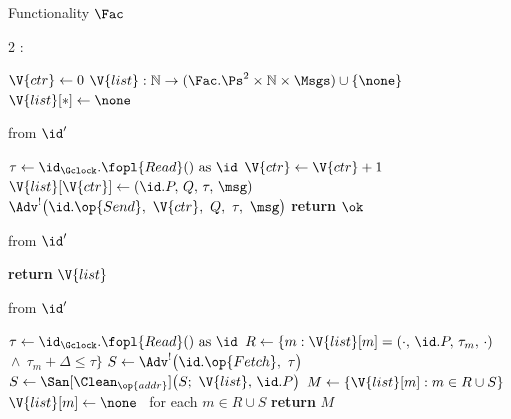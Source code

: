 \begin{interface}[nofloat]{Functionality $\Fac$ \\
\params{$\PID$, \quad $\Ps$, \quad $\admits$, \quad
$\uses := \{(\Gclock,\serves),\,(\Adv,\serves)\}$, \quad $\pars := \Delta$}}

{\scriptsize
\setlength{\columnsep}{1.4em}
\begin{multicols}{2}
:
\begin{algorithmic}[1]
\setcounter{contline}{0}\algcont
\State $\V{ctr} \gets 0$
\State $\V{list} : \mathbb{N} \to (\Fac.\Ps^{2} \times \mathbb{N} \times \Msgs) \cup \{\none\}$
\State $\V{list}[*] \gets \none$
\algsave
\end{algorithmic}
\vspace{1.4ex}

 \quad from $\id'$
\begin{algorithmic}[1]
\algcont
\State $\tau \gets \id_{\Gclock}.\fopl{Read}() \text{ as } \id$ \label{ln:acsendread}
\State $\V{ctr} \gets \V{ctr} + 1$
\State $\V{list}[\V{ctr}] \gets (\id.P,\, Q,\, \tau,\, \msg)$
\State $\Adv^{!}\bigl(\id.\op{Send},\ \V{ctr},\ Q,\ \tau,\ \msg\bigr)$ \label{ln:acsend}
\State \textbf{return} $\ok$
\algsave
\end{algorithmic}
\vspace{1.4ex}

 \quad from $\id'$
\begin{algorithmic}[1]
\algcont
\State \textbf{return} $\V{list}$
\algsave
\end{algorithmic}

\columnbreak

 \quad from $\id'$
\begin{algorithmic}[1]
\algcont
\State $\tau \gets \id_{\Gclock}.\fopl{Read}() \text{ as } \id$ \label{ln:acfetchread}
\State $R \gets \{m : \V{list}[m] = (\cdot,\, \id.P,\, \tau_m,\, \cdot)$
\State \quad ${}\wedge\ \tau_m + \Delta \leq \tau\}$ \label{ln:acripe}
\State $S \gets \Adv^{!}\bigl(\id.\op{Fetch},\ \tau\bigr)$ \label{ln:acquery}
\State $S \gets \San[\Clean_{\op{addr}}]\bigl(S;\ \V{list},\, \id.P\bigr)$ \label{ln:acsan}
\State $M \gets \{\V{list}[m] : m \in R \cup S\}$
\State $\V{list}[m] \gets \none$ \ for each $m \in R \cup S$ \label{ln:acdrain}
\State \textbf{return} $M$
\algsave
\end{algorithmic}
\end{multicols}}
\end{interface}
